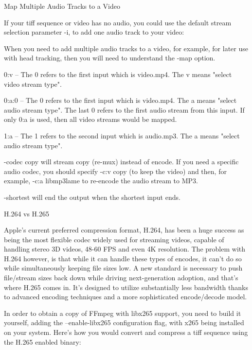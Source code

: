 \begin{fullwidth}
{\large Map Multiple Audio Tracks to a Video \par}

If your tiff sequence or video has no audio, you could use the default stream selection parameter -i, to add one audio track to your video: 


When you need to add multiple audio tracks to a video, for example, for later use with head tracking, then you will need to understand the -map option.


0:v – The 0 refers to the first input which is video.mp4. The v means "select video stream type".

0:a:0 – The 0 refers to the first input which is video.mp4. The a means "select audio stream type". The last 0 refers to the first audio stream from this input. If only 0:a is used, then all video streams would be mapped.

1:a – The 1 refers to the second input which is audio.mp3. The a means "select audio stream type".

-codec copy will stream copy (re-mux) instead of encode. If you need a specific audio codec, you should specify -c:v copy (to keep the video) and then, for example, -c:a libmp3lame to re-encode the audio stream to MP3.

-shortest will end the output when the shortest input ends.

{\large H.264 vs H.265 \par}

Apple’s current preferred compression format, H.264, has been a huge success as being the most flexible codec widely used for streaming videos, capable of handling stereo 3D videos, 48-60 FPS and even 4K resolution. The problem with H.264 however, is that while it can handle these types of encodes, it can’t do so while simultaneously keeping file sizes low. A new standard is necessary to push file/stream sizes back down while driving next-generation adoption, and that’s where H.265 comes in. It’s designed to utilize substantially less bandwidth thanks to advanced encoding techniques and a more sophisticated encode/decode model.

In order to obtain a copy of FFmpeg with libx265 support, you need to build it yourself, adding the --enable-libx265 configuration flag, with x265 being installed on your system. Here’s how you would convert and compress a tiff sequence using the H.265 enabled binary:


\end{fullwidth}

